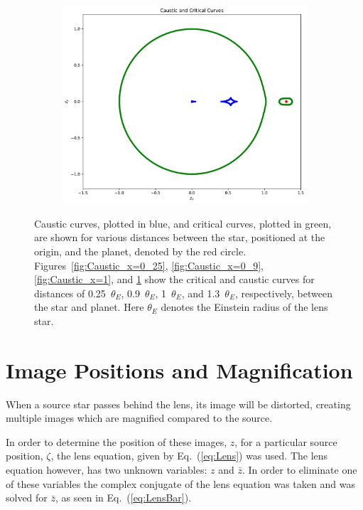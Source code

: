 \documentclass{article}
\begin{document}
\begin{figure}[h]
\begin{subfigure}{.5\textwidth}
\begin{minipage}[c]{0.85\textwidth}
  \end{minipage}\hfill
\end{subfigure}%
\begin{subfigure}{.5\textwidth}
  \begin{minipage}{0.1\textwidth}
    \caption{} \label{fig:Caustic_x=1_3}
  \end{minipage}\hfill
\begin{minipage}[c]{0.85\textwidth}
    \includegraphics[width=7 cm]{Critical_and_Caustic_Curves_x_1_3.pdf}
  \end{minipage}\hfill
\end{subfigure}%
\captionsetup{justification=centering}
\caption{\label{fig:Caustic_Curves} Caustic curves, plotted in blue, and critical curves, plotted in green, are shown for various distances between the star, positioned at the origin, and the planet, denoted by the red circle. Figures~\ref{fig:Caustic_x=0_25}, \ref{fig:Caustic_x=0_9}, \ref{fig:Caustic_x=1}, and \ref{fig:Caustic_x=1_3} show the critical and caustic curves for distances of 0.25~$\theta_E$, 0.9~$\theta_E$, 1~$\theta_E$, and 1.3~$\theta_E$, respectively, between the star and planet. Here $\theta_E$ denotes the Einstein radius of the lens star.}
\end{figure}


\section{Image Positions and Magnification}

When a source star passes behind the lens, its image will be distorted, creating multiple images which are magnified compared to the source. 

In order to determine the position of these images, $z$, for a particular source position, $\zeta$, the lens equation, given by Eq.~(\ref{eq:Lens}) was used. The lens equation however, has two unknown variables: $z$ and $\bar{z}$. In order to eliminate one of these variables the complex conjugate of the lens equation was taken and was solved for $\bar{z}$, as seen in Eq.~(\ref{eq:LensBar}).
\end{document}
